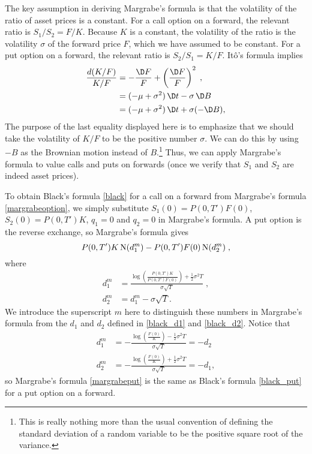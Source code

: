 The key assumption in deriving Margrabe's formula is that the volatility of the ratio of asset prices is a constant.  For a call option on a forward, the relevant ratio is $S_1/S_2 = F/K$.  Because $K$ is a constant, the volatility of the ratio is the volatility $\sigma$ of the forward price $F$, which we have assumed to be constant.  For a put option on a forward, the relevant ratio is $S_2/S_1 = K/F$.  It\^o's formula implies
\begin{align*}
\frac{d(K/F)}{K/F} &= -\frac{\D F}{F} + \left(\frac{\D F}{F}\right)^2\; ,\\
&= (-\mu +\sigma^2)\,\D t - \sigma\,\D B\\
&= (-\mu+\sigma^2)\,\D t + \sigma (-\D B),
\end{align*}
The purpose of the last equality displayed here is to emphasize that we should take the volatility of $K/F$ to be the positive number $\sigma$.  We can do this by using $-B$ as the Brownian motion instead of $B$.\footnote{This is really nothing more than the usual convention of defining the standard deviation of a random variable to be the positive square root of the variance.} Thus, we can apply Margrabe's formula to value calls and puts on forwards (once we verify that $S_1$ and $S_2$ are indeed asset prices).  

To obtain Black's formula \eqref{black} for a call on a forward from Margrabe's formula \eqref{margrabeoption}, we simply substitute $S_1(0)=P(0,T')F(0)$, $S_2(0)=P(0,T')K$, $q_1=0$ and $q_2=0$ in Margrabe's formula.   A put option is the reverse exchange, so Margrabe's formula gives
\begin{equation}\label{margrabeput}
P(0,T')K\operatorname{N}(d^m_1) - P(0,T')F(0)\operatorname{N}(d^m_2)\;,
\end{equation}
where
\begin{align*}
d^m_1&= \frac{\log\left(\frac{P(0,T')K}{P(0,T')F(0)}\right)+\frac{1}{2}\sigma^2T}{\sigma\sqrt{T}}\; ,\\
d^m_2 &=d^m_1-\sigma\sqrt{T}.
\end{align*}
We introduce the superscript $m$ here to distinguish these numbers in Margrabe's formula from the $d_1$ and $d_2$ defined in \eqref{black_d1} and \eqref{black_d2}.  Notice that
\begin{align*}
d^m_1& = -\frac{\log\left(\frac{F(0)}{K}\right)-\frac{1}{2}\sigma^2T}{\sigma\sqrt{T}} = -d_2\\
d^m_2 &= -\frac{\log\left(\frac{F(0)}{K}\right)+\frac{1}{2}\sigma^2T}{\sigma\sqrt{T}} =-d_1,
\end{align*}
so Margrabe's formula \eqref{margrabeput} is the same as Black's formula \eqref{black_put} for a put option on a forward.

